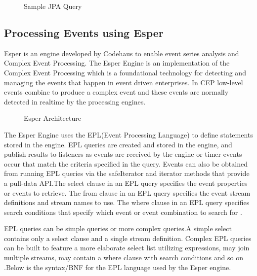 

\begin{center}
\begin{figure}[h]
\caption{Sample JPA Query }

\end{figure}
\end{center}

\subsection{Processing Events using Esper}

\noindent Esper is an engine developed by Codehaus \cite{twentyfive} to enable  event series analysis and Complex Event Processing. The Esper Engine is an implementation of the Complex Event Processing which is a foundational technology for detecting and managing the events that happen in event driven enterprises. In CEP low-level events combine to produce a complex event and these events are normally detected in realtime by the processing engines. 
\newpage

\begin{center}
\begin{figure}[h]
\caption{Esper Architecture\cite{twentyfive}}

\end{figure}
\end{center}
 

\noindent The Esper Engine uses the EPL(Event Processing Language) to define statements stored in the engine. EPL queries are created and stored in the engine, and publish results to listeners as events are received by the engine or timer events occur that match the criteria specified in the query. Events can also be obtained from running EPL queries via the safeIterator and iterator methods that provide a pull-data API.The select clause in an EPL query specifies the event properties or events to retrieve. The from clause in an EPL query specifies the event stream  definitions and stream names to use. The where clause in an EPL query specifies search conditions that specify which event or event combination to search for \cite{twentyfive}.

\noindent EPL queries can be simple queries or more complex queries.A simple select contains only a select  clause and a single stream definition. Complex EPL queries can be built to feature a more elaborate select list utilizing expressions, may join multiple streams, may contain a where clause with search conditions and so on \cite{twentyfive}.Below is the syntax/BNF for the EPL language used by the Esper engine.

